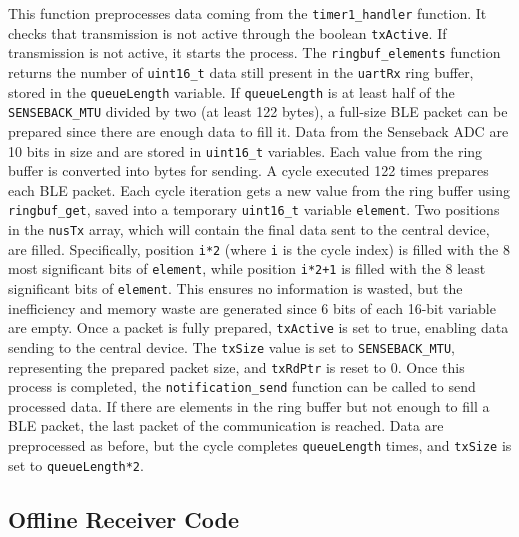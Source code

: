 \documentclass{Configuration_Files/PoliMi3i_thesis}
\begin{document}
This function preprocesses data coming from the \texttt{timer1\_handler} function. It checks that transmission is not active through the boolean \texttt{txActive}. If transmission is not active, it starts the process. The \texttt{ringbuf\_elements} function returns the number of \texttt{uint16\_t} data still present in the \texttt{uartRx} ring buffer, stored in the \texttt{queueLength} variable. If \texttt{queueLength} is at least half of the \texttt{SENSEBACK\_MTU} divided by two (at least 122 bytes), a full-size BLE packet can be prepared since there are enough data to fill it. Data from the Senseback ADC are 10 bits in size and are stored in \texttt{uint16\_t} variables. Each value from the ring buffer is converted into bytes for sending. A cycle executed 122 times prepares each BLE packet. Each cycle iteration gets a new value from the ring buffer using \texttt{ringbuf\_get}, saved into a temporary \texttt{uint16\_t} variable \texttt{element}. Two positions in the \texttt{nusTx} array, which will contain the final data sent to the central device, are filled. Specifically, position \texttt{i*2} (where \texttt{i} is the cycle index) is filled with the 8 most significant bits of \texttt{element}, while position \texttt{i*2+1} is filled with the 8 least significant bits of \texttt{element}. This ensures no information is wasted, but the inefficiency and memory waste are generated since 6 bits of each 16-bit variable are empty. Once a packet is fully prepared, \texttt{txActive} is set to true, enabling data sending to the central device. The \texttt{txSize} value is set to \texttt{SENSEBACK\_MTU}, representing the prepared packet size, and \texttt{txRdPtr} is reset to 0. Once this process is completed, the \texttt{notification\_send} function can be called to send processed data. If there are elements in the ring buffer but not enough to fill a BLE packet, the last packet of the communication is reached. Data are preprocessed as before, but the cycle completes \texttt{queueLength} times, and \texttt{txSize} is set to \texttt{queueLength*2}.

\subsection*{Offline Receiver Code}
\end{document}
